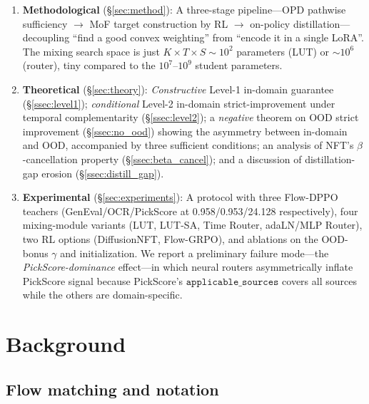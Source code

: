 \documentclass[11pt,a4paper]{article}
\theoremstyle{definition}
\begin{document}
\begin{enumerate}[leftmargin=1.5em]
\item \textbf{Methodological} (\S\ref{sec:method}):
A three-stage pipeline---OPD pathwise sufficiency $\to$ MoF target
construction by RL $\to$ on-policy distillation---decoupling
``find a good convex weighting'' from ``encode it in a single LoRA''.
The mixing search space is just $K\times T\times S\sim 10^2$ parameters
(LUT) or $\sim 10^6$ (router), tiny compared to the $10^7$--$10^9$ student
parameters.

\item \textbf{Theoretical} (\S\ref{sec:theory}):
\emph{Constructive} Level-1 in-domain guarantee (\S\ref{ssec:level1});
\emph{conditional} Level-2 in-domain strict-improvement under temporal
complementarity (\S\ref{ssec:level2}); a \emph{negative} theorem on OOD
strict improvement (\S\ref{ssec:no_ood}) showing the asymmetry between
in-domain and OOD, accompanied by three sufficient conditions; an
analysis of NFT's $\beta$-cancellation property (\S\ref{ssec:beta_cancel});
and a discussion of distillation-gap erosion (\S\ref{ssec:distill_gap}).

\item \textbf{Experimental} (\S\ref{sec:experiments}):
A protocol with three Flow-DPPO teachers
(GenEval/OCR/PickScore at 0.958/0.953/24.128 respectively), four
mixing-module variants (LUT, LUT-SA, Time Router, adaLN/MLP Router),
two RL options (DiffusionNFT, Flow-GRPO), and ablations on the OOD-bonus
$\gamma$ and initialization. We report a preliminary failure mode---the
\emph{PickScore-dominance} effect---in which neural routers asymmetrically
inflate PickScore signal because PickScore's $\texttt{applicable\_sources}$
covers all sources while the others are domain-specific.
\end{enumerate}

\section{Background}
\label{sec:background}

\subsection{Flow matching and notation}
\end{document}
